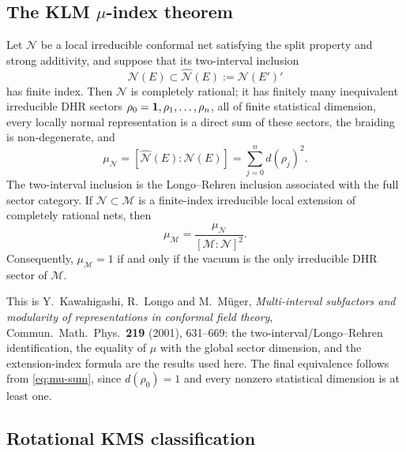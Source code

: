 \subsection{\texorpdfstring{The KLM $\mu$-index theorem}{The KLM mu-index theorem}}

\begin{theorem}
\label{thm:klm}
Let $\mathcal N$ be a local irreducible conformal net satisfying the
split property and strong additivity, and suppose that its
two-interval inclusion
\[
 \mathcal N(E)\subset\widehat{\mathcal N}(E)
 :=\mathcal N(E')'
\]
has finite index.  Then $\mathcal N$ is completely rational; it has
finitely many inequivalent irreducible DHR sectors
$\rho_0=\mathbf 1,\rho_1,\ldots,\rho_n$, all of finite statistical
dimension, every locally normal representation is a direct sum of
these sectors, the braiding is non-degenerate, and
\[
 \mu_{\mathcal N}
 =[\widehat{\mathcal N}(E):\mathcal N(E)]
 =\sum_{j=0}^{n}d(\rho_j)^2.
\tag{2.7}\label{eq:mu-sum}
\]
The two-interval inclusion is the Longo--Rehren inclusion associated
with the full sector category.  If
$\mathcal N\subset\mathcal M$ is a finite-index irreducible local
extension of completely rational nets, then
\[
 \mu_{\mathcal M}
 =\frac{\mu_{\mathcal N}}{[\mathcal M:\mathcal N]^2}.
\tag{2.8}\label{eq:mu-extension}
\]
Consequently, $\mu_{\mathcal M}=1$ if and only if the vacuum is the
only irreducible DHR sector of $\mathcal M$.
\end{theorem}

This is Y.~Kawahigashi, R.~Longo and M.~M\"uger,
\emph{Multi-interval subfactors and modularity of representations in
conformal field theory}, Commun.\ Math.\ Phys.\ \textbf{219} (2001),
631--669: the two-interval/Longo--Rehren identification, the equality
of $\mu$ with the global sector dimension, and the extension-index
formula are the results used here.  The final equivalence follows
from \eqref{eq:mu-sum}, since $d(\rho_0)=1$ and every nonzero
statistical dimension is at least one.

\subsection{Rotational KMS classification}

